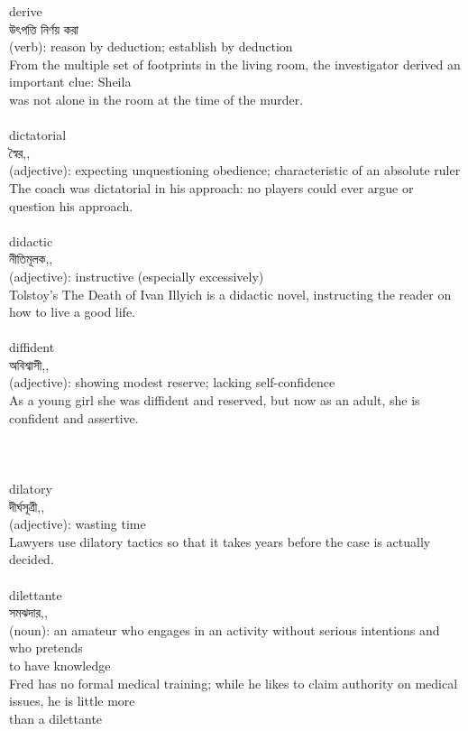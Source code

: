 \documentclass{article}
\begin{document}
{derive}\\
{উৎপত্তি নির্ণয় করা}\\
{(verb): reason by deduction; establish by deduction\\From the multiple set of footprints in the living room, the investigator derived an important clue: Sheila\\was not alone in the room at the time of the murder.\\}\\
{dictatorial}\\
{স্বৈর,,}\\
{(adjective): expecting unquestioning obedience; characteristic of an absolute ruler\\The coach was dictatorial in his approach: no players could ever argue or question his approach.\\}\\
{didactic}\\
{নীতিমূলক,,}\\
{(adjective): instructive (especially excessively)\\Tolstoy's The Death of Ivan Illyich is a didactic novel, instructing the reader on how to live a good life.\\}\\
{diffident}\\
{অবিশ্বাসী,,}\\
{(adjective): showing modest reserve; lacking self-confidence\\As a young girl she was diffident and reserved, but now as an adult, she is confident and assertive.\\\\                                                                                  \\}\\
{dilatory}\\
{দীর্ঘসূত্রী,,}\\
{(adjective): wasting time\\Lawyers use dilatory tactics so that it takes years before the case is actually decided.\\}\\
{dilettante}\\
{সমঝদার,,}\\
{(noun): an amateur who engages in an activity without serious intentions and who pretends\\to have knowledge\\Fred has no formal medical training; while he likes to claim authority on medical issues, he is little more\\than a dilettante\\}\\
\end{document}
